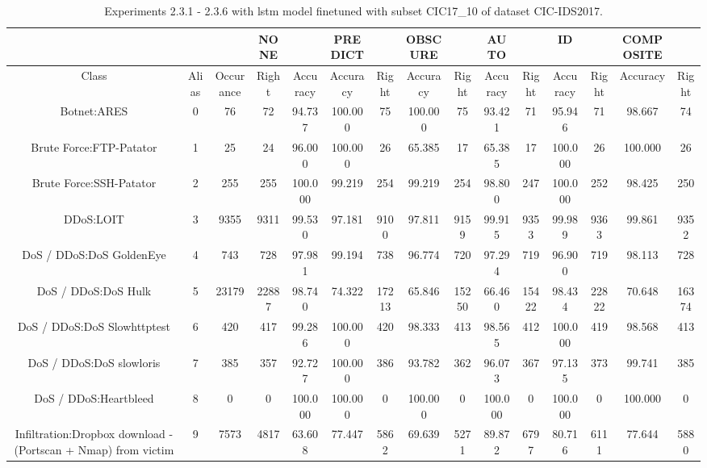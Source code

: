 \begin{table}[htb]
    \centering
    \caption{Experiments 2.3.1 - 2.3.6 with \gls{lstm} model finetuned with subset CIC17\_10 of dataset CIC-IDS2017.}
    \label{table:results:lstm:flows_subset}
    \begin{tabular}{@{}ccccccccccccccc@{}}
        \toprule
         &  &  & NONE &  & PREDICT &  & OBSCURE &  & AUTO &  & ID &  & COMPOSITE &  \\
        \midrule
        Class &  Alias &  Occurance &  Right &  Accuracy &  Accuracy &  Right &  Accuracy &  Right &  Accuracy &  Right &  Accuracy &  Right &  Accuracy &  Right \\
        Botnet:ARES &  0 &  76 &  72 &  94.737 &  100.000 &  75 &  100.000 &  75 &  93.421 &  71 &  95.946 &  71 &  98.667 &  74 \\
        Brute Force:FTP-Patator &  1 &  25 &  24 &  96.000 &  100.000 &  26 &  65.385 &  17 &  65.385 &  17 &  100.000 &  26 &  100.000 &  26 \\
        Brute Force:SSH-Patator &  2 &  255 &  255 &  100.000 &  99.219 &  254 &  99.219 &  254 &  98.800 &  247 &  100.000 &  252 &  98.425 &  250 \\
        DDoS:LOIT &  3 &  9355 &  9311 &  99.530 &  97.181 &  9100 &  97.811 &  9159 &  99.915 &  9353 &  99.989 &  9363 &  99.861 &  9352 \\
        DoS / DDoS:DoS GoldenEye &  4 &  743 &  728 &  97.981 &  99.194 &  738 &  96.774 &  720 &  97.294 &  719 &  96.900 &  719 &  98.113 &  728 \\
        DoS / DDoS:DoS Hulk &  5 &  23179 &  22887 &  98.740 &  74.322 &  17213 &  65.846 &  15250 &  66.460 &  15422 &  98.434 &  22822 &  70.648 &  16374 \\
        DoS / DDoS:DoS Slowhttptest &  6 &  420 &  417 &  99.286 &  100.000 &  420 &  98.333 &  413 &  98.565 &  412 &  100.000 &  419 &  98.568 &  413 \\
        DoS / DDoS:DoS slowloris &  7 &  385 &  357 &  92.727 &  100.000 &  386 &  93.782 &  362 &  96.073 &  367 &  97.135 &  373 &  99.741 &  385 \\
        DoS / DDoS:Heartbleed &  8 &  0 &  0 &  100.000 &  100.000 &  0 &  100.000 &  0 &  100.000 &  0 &  100.000 &  0 &  100.000 &  0 \\
        Infiltration:Dropbox download - (Portscan + Nmap) from victim &  9 &  7573 &  4817 &  63.608 &  77.447 &  5862 &  69.639 &  5271 &  89.872 &  6797 &  80.716 &  6111 &  77.644 &  5880 \\

\end{tabular}
\end{table}
